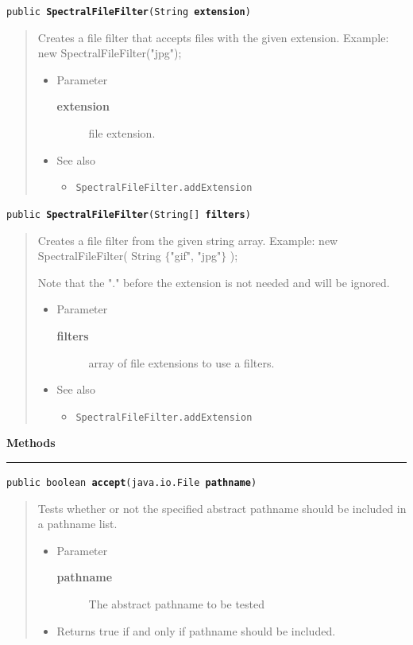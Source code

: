 \documentclass[twoside,11pt]{article}
\renewcommand{\_}{\texttt{\symbol{95}}}
\newcommand{\refdefined}[1]{}
\newcommand{\method}[1]{\texttt{#1}}
\newenvironment{desc}{\begin{quote}}{\end{quote}}
\newcommand{\methods}{
   \par\textbf{\large{Methods}}\\
   \hrule
}
\begin{document}
\method{public \textbf{SpectralFileFilter}(\texttt{String} \textbf{extension})\label{l247}\label{l248}}
\begin{desc}Creates a file filter that accepts files with the given extension.
 Example: new SpectralFileFilter("jpg");
\begin{itemize}
\item{Parameter
  \begin{description}
   \item[\textbf{extension}]{file extension.}
  \end{description}}
\end{itemize}
\begin{itemize}
\item{{See also}
  \begin{itemize}
   \item{\texttt{SpectralFileFilter.addExtension} {
\refdefined{l246}}
}
  \end{itemize}
}
\end{itemize}
\end{desc}

\method{public \textbf{SpectralFileFilter}(\texttt{String[]} \textbf{filters})\label{l249}\label{l250}}
\begin{desc}Creates a file filter from the given string array.
 Example: new SpectralFileFilter( String $\{$"gif", "jpg"$\}$ );

 Note that the "." before the extension is not needed and will
 be ignored.
\begin{itemize}
\item{Parameter
  \begin{description}
   \item[\textbf{filters}]{array of file extensions to use a filters.}
  \end{description}}
\end{itemize}
\begin{itemize}
\item{{See also}
  \begin{itemize}
   \item{\texttt{SpectralFileFilter.addExtension} {
\refdefined{l246}}
}
  \end{itemize}
}
\end{itemize}
\end{desc}

\methods
\method{public boolean \textbf{accept}(\texttt{java.io.File} \textbf{pathname})\label{l251}\label{l252}}
\begin{desc}Tests whether or not the specified abstract pathname should be
 included in a pathname list.
\begin{itemize}
\item{Parameter
  \begin{description}
   \item[\textbf{pathname}]{The abstract pathname to be tested}
  \end{description}}
\end{itemize}
\begin{itemize}
\item{Returns true if and only if pathname should be included. }
\end{itemize}
\end{desc}
\end{document}
